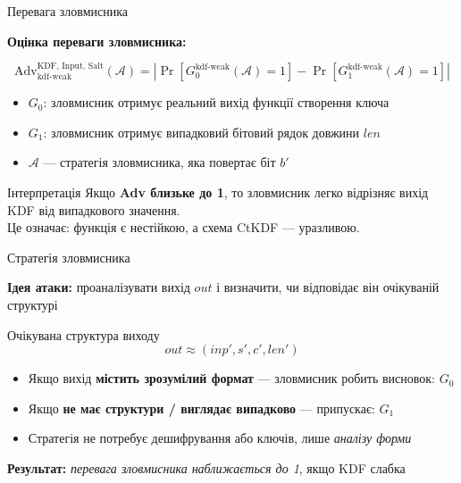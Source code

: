 \documentclass{beamer}
\begin{document}
\begin{frame}{Перевага зловмисника}

\vspace{0.5em}
\textbf{Оцінка переваги зловмисника:}

\[
\text{Adv}_{\text{kdf-weak}}^{\text{KDF, Input, Salt}}(\mathcal{A}) =
\left| \Pr[G_0^{\text{kdf-weak}}(\mathcal{A}) = 1] - \Pr[G_1^{\text{kdf-weak}}(\mathcal{A}) = 1] \right|
\]

\vspace{1em}
\begin{itemize}
  \item $G_0$: зловмисник отримує реальний вихід функції створення ключа
  \item $G_1$: зловмисник отримує випадковий бітовий рядок довжини $len$
  \item $\mathcal{A}$ — стратегія зловмисника, яка повертає біт $b'$
\end{itemize}

\vspace{0.5em}
\begin{block}{Інтерпретація}
  Якщо \textbf{Adv близьке до 1}, то зловмисник легко відрізняє вихід KDF від випадкового значення.\\
  Це означає: \alert{функція є нестійкою, а схема CtKDF — уразливою}.
\end{block}

\end{frame}


\begin{frame}{Стратегія зловмисника}

\vspace{0.5em}
\textbf{Ідея атаки:} проаналізувати вихід $out$ і визначити, чи відповідає він очікуваній структурі

\vspace{0.5em}
\begin{block}{Очікувана структура виходу}
  \[
    out \approx (inp', s', c', len')
  \]
\end{block}

\vspace{0.5em}
\begin{itemize}
  \item Якщо вихід \textbf{містить зрозумілий формат} — зловмисник робить висновок: $G_0$
  \item Якщо \textbf{не має структури / виглядає випадково} — припускає: $G_1$
  \item Стратегія не потребує дешифрування або ключів, лише \textit{аналізу форми}
\end{itemize}

\vspace{0.5em}
\textbf{Результат:} \textit{перевага зловмисника наближається до 1}, якщо KDF слабка

\end{frame}
\end{document}
